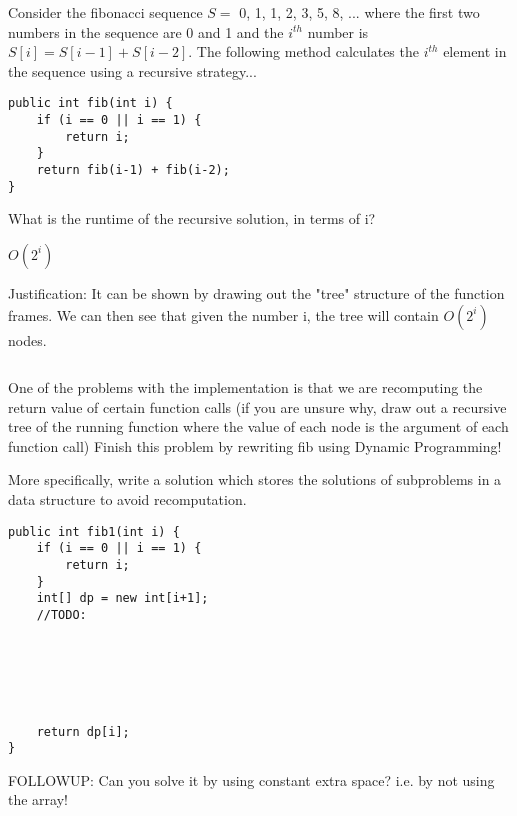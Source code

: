 
\question Consider the fibonacci sequence $S = $ 0, 1, 1, 2, 3, 5, 8, ... where the first two numbers in the sequence are 0 and 1 and the $i^{th}$ number is $S[i] = S[i - 1] + S[i-2]$. The following method calculates the $i^{th}$ element in the sequence using a recursive strategy... \n


\begin{lstlisting}
public int fib(int i) {
    if (i == 0 || i == 1) {
        return i;
    }
    return fib(i-1) + fib(i-2);
}
\end{lstlisting}


\begin{parts}
\item What is the runtime of the recursive solution, in terms of i?
\begin{solution}
$O(2^i)$

Justification: It can be shown by drawing out the "tree" structure of the function frames. We can then see that given the number i, the tree will contain $O(2^i)$ nodes.
\end{solution}
\linebreak
\linebreak
\linebreak

\begin{lstlisting}
\end{lstlisting}


\item One of the problems with the implementation  is that we are recomputing the return value of certain function calls (if you are unsure why, draw out a recursive tree of the running function where the value of each node is the argument of each function call) Finish this problem by rewriting fib using Dynamic Programming! 

More specifically, write a solution which stores the solutions of subproblems in a data structure to avoid recomputation.
\ifprintanswers\else
\begin{lstlisting}
public int fib1(int i) {
    if (i == 0 || i == 1) {
        return i;
    }
    int[] dp = new int[i+1];
    //TODO:
    




    
    return dp[i];
}
\end{lstlisting}

\newpage

FOLLOWUP: Can you solve it by using constant extra space? i.e. by not using the array!


\end{parts}
